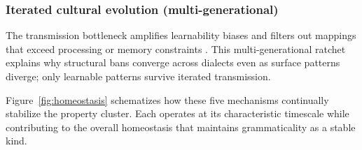 \documentclass[12pt]{article}
\begin{document}
\subsubsection{Iterated cultural evolution (multi-generational)}
    The transmission bottleneck amplifies learnability biases and filters out mappings that exceed processing or memory constraints \parencite{Kirby2014}. This multi-generational ratchet explains why structural bans converge across dialects even as surface patterns diverge; only learnable patterns survive iterated transmission.

Figure~\ref{fig:homeostasis} schematizes how these five mechanisms continually stabilize the property cluster. Each operates at its characteristic timescale while contributing to the overall homeostasis that maintains grammaticality as a stable kind.
\end{document}
